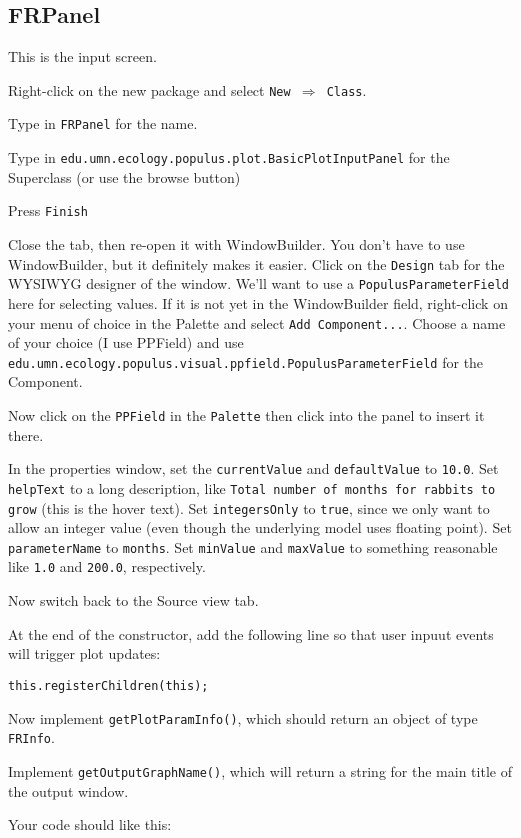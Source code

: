 \documentclass[12pt]{article}
\begin{document}
\subsection{FRPanel}
This is the input screen.

Right-click on the new package and select \texttt{New $\Rightarrow$ Class}.

Type in \texttt{FRPanel} for the name.

Type in \texttt{edu.umn.ecology.populus.plot.BasicPlotInputPanel} for the Superclass (or use the browse button)

Press \texttt{Finish}

Close the tab, then re-open it with WindowBuilder.  You don't have to use WindowBuilder, but it definitely makes it easier.
Click on the \texttt{Design} tab for the WYSIWYG designer of the window.
We'll want to use a \texttt{PopulusParameterField} here for selecting values.  If it is not yet in the WindowBuilder field, right-click on your menu of choice in the Palette and select \texttt{Add Component...}. Choose a name of your choice (I use PPField) and use \texttt{edu.umn.ecology.populus.visual.ppfield.PopulusParameterField} for the Component.


Now click on the \texttt{PPField} in the \texttt{Palette} then click into the panel to insert it there.

In the properties window, set the \texttt{currentValue} and \texttt{defaultValue} to \texttt{10.0}.  Set \texttt{helpText} to a long description, like \texttt{Total number of months for rabbits to grow} (this is the hover text).  Set \texttt{integersOnly} to \texttt{true}, since we only want to allow an integer value (even though the underlying model uses floating point).  Set \texttt{parameterName} to \texttt{months}.  Set \texttt{minValue} and \texttt{maxValue} to something reasonable like \texttt{1.0} and \texttt{200.0}, respectively.

Now switch back to the Source view tab.

At the end of the constructor, add the following line so that user inpuut events will trigger plot updates:

\texttt{this.registerChildren(this);}

Now implement \texttt{getPlotParamInfo()}, which should return an object of type \texttt{FRInfo}.

Implement \texttt{getOutputGraphName()}, which will return a string for the main title of the output window.

Your code should like this:
\end{document}
